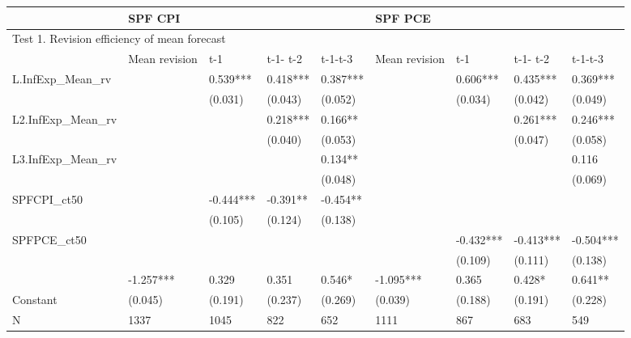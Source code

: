 \documentclass[]{article}
\begin{document}
\begin{adjustbox}{angle=90}\label{RevEfficiency}
	\begin{tabular}{lllllllll}
		\hline 
		& \multicolumn{4}{l}{SPF CPI}                     & \multicolumn{4}{l}{SPF PCE}                       \\
		\hline 
		\multicolumn{9}{l}{Test 1.  Revision efficiency of mean forecast}            \\
	                                            \hline 
		& Mean revision & t-1       & t-1- t-2 & t-1-t-3  & Mean revision & t-1       & t-1- t-2  & t-1-t-3   \\
		\hline 
		L.InfExp\_Mean\_rv  &               & 0.539***  & 0.418*** & 0.387*** &               & 0.606***  & 0.435***  & 0.369***  \\
		&               & (0.031)   & (0.043)  & (0.052)  &               & (0.034)   & (0.042)   & (0.049)   \\
		L2.InfExp\_Mean\_rv &               &           & 0.218*** & 0.166**  &               &           & 0.261***  & 0.246***  \\
		&               &           & (0.040)  & (0.053)  &               &           & (0.047)   & (0.058)   \\
		L3.InfExp\_Mean\_rv &               &           &          & 0.134**  &               &           &           & 0.116     \\
		&               &           &          & (0.048)  &               &           &           & (0.069)   \\
		SPFCPI\_ct50        &               & -0.444*** & -0.391** & -0.454** &               &           &           &           \\
		&               & (0.105)   & (0.124)  & (0.138)  &               &           &           &           \\
		SPFPCE\_ct50        &               &           &          &          &               & -0.432*** & -0.413*** & -0.504*** \\
		&               &           &          &          &               & (0.109)   & (0.111)   & (0.138)   \\
		& -1.257***     & 0.329     & 0.351    & 0.546*   & -1.095***     & 0.365     & 0.428*    & 0.641**   \\
		Constant & (0.045)       & (0.191)   & (0.237)  & (0.269)  & (0.039)       & (0.188)   & (0.191)   & (0.228)   \\
		\hline 
		N                   & 1337          & 1045      & 822      & 652      & 1111          & 867       & 683       & 549       \\

\end{tabular}
\end{adjustbox}
\end{document}
